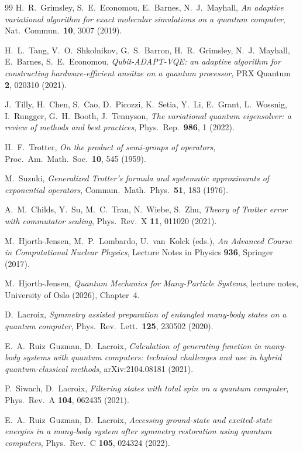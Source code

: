 \documentclass[
  aps,            %
  prc,            %
  reprint,        %
  superscriptaddress,
  floatfix,
  nofootinbib
]{revtex4-2}
\begin{document}
\begin{thebibliography}{99}
H.~R.~Grimsley, S.~E.~Economou, E.~Barnes, N.~J.~Mayhall,
\textit{An adaptive variational algorithm for exact molecular simulations on a
quantum computer},
Nat.\ Commun.\ \textbf{10}, 3007 (2019).

H.~L.~Tang, V.~O.~Shkolnikov, G.~S.~Barron, H.~R.~Grimsley, N.~J.~Mayhall,
E.~Barnes, S.~E.~Economou,
\textit{Qubit-ADAPT-VQE: an adaptive algorithm for constructing
hardware-efficient ans\"atze on a quantum processor},
PRX Quantum \textbf{2}, 020310 (2021).

J.~Tilly, H.~Chen, S.~Cao, D.~Picozzi, K.~Setia, Y.~Li, E.~Grant, L.~Wossnig,
I.~Rungger, G.~H.~Booth, J.~Tennyson,
\textit{The variational quantum eigensolver: a review of methods and best
practices},
Phys.\ Rep.\ \textbf{986}, 1 (2022).

H.~F.~Trotter,
\textit{On the product of semi-groups of operators},
Proc.\ Am.\ Math.\ Soc.\ \textbf{10}, 545 (1959).

M.~Suzuki,
\textit{Generalized Trotter's formula and systematic approximants of exponential
operators},
Commun.\ Math.\ Phys.\ \textbf{51}, 183 (1976).

A.~M.~Childs, Y.~Su, M.~C.~Tran, N.~Wiebe, S.~Zhu,
\textit{Theory of Trotter error with commutator scaling},
Phys.\ Rev.\ X \textbf{11}, 011020 (2021).

M.~Hjorth-Jensen, M.~P.~Lombardo, U.~van~Kolck (eds.),
\textit{An Advanced Course in Computational Nuclear Physics},
Lecture Notes in Physics \textbf{936}, Springer (2017).

M.~Hjorth-Jensen,
\textit{Quantum Mechanics for Many-Particle Systems},
lecture notes, University of Oslo (2026), Chapter~4.

D.~Lacroix,
\textit{Symmetry assisted preparation of entangled many-body states on a quantum computer},
Phys.\ Rev.\ Lett.\ \textbf{125}, 230502 (2020).

E.~A.~Ruiz~Guzman, D.~Lacroix,
\textit{Calculation of generating function in many-body systems with quantum computers: technical challenges and use in hybrid quantum-classical methods},
arXiv:2104.08181 (2021).

P.~Siwach, D.~Lacroix,
\textit{Filtering states with total spin on a quantum computer},
Phys.\ Rev.\ A \textbf{104}, 062435 (2021).

E.~A.~Ruiz~Guzman, D.~Lacroix,
\textit{Accessing ground-state and excited-state energies in a many-body system after symmetry restoration using quantum computers},
Phys.\ Rev.\ C \textbf{105}, 024324 (2022).


\end{thebibliography}
\end{document}
